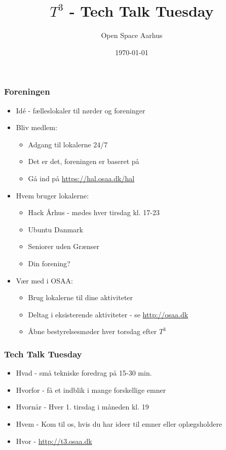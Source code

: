 \documentclass{beamer}
\title[${T^3}$ - Tech Talk Tuesday]{${T^3}$ - Tech Talk Tuesday}
\author{Open Space Aarhus}
\date{\today}
\institute[Bryggervej 30]{Bryggervej 30, 8240 Århus N}
\begin{document}
\begin{frame}[label=titlepage]
  \titlepage
\end{frame}

\begin{frame}
  \frametitle{Foreningen}
  \begin{itemize}
  \item Idé - fælleslokaler til nørder og foreninger
  \item Bliv medlem:
    \begin{itemize}
    \item Adgang til lokalerne 24/7
    \item Det er det, foreningen er baseret på
    \item Gå ind på  \url{https://hal.osaa.dk/hal}
    \end{itemize}
  \item Hvem bruger lokalerne:
    \begin{itemize}
    \item Hack Århus - mødes hver tirsdag kl. 17-23
    \item Ubuntu Danmark
    \item Seniorer uden Grænser
    \item Din forening?
    \end{itemize}
  \item Vær med i OSAA:
    \begin{itemize}
    \item Brug lokalerne til dine aktiviteter
    \item Deltag i eksisterende aktiviteter - se \url{http://osaa.dk}
    \item Åbne bestyrelsesmøder hver torsdag efter ${T^3}$
    \end{itemize}
  \end{itemize}						
\end{frame}

\begin{frame}
  \frametitle{Tech Talk Tuesday}
  \begin{itemize}		  
  \item Hvad - små tekniske foredrag på 15-30 min.
  \item Hvorfor - få et indblik i mange forskellige emner
  \item Hvornår - Hver 1. tirsdag i måneden kl. 19
  \item Hvem - Kom til os, hvis du har ideer til emner eller oplægsholdere
  \item Hvor - \url{http://t3.osaa.dk}
  \end{itemize}						
\end{frame}
\end{document}
